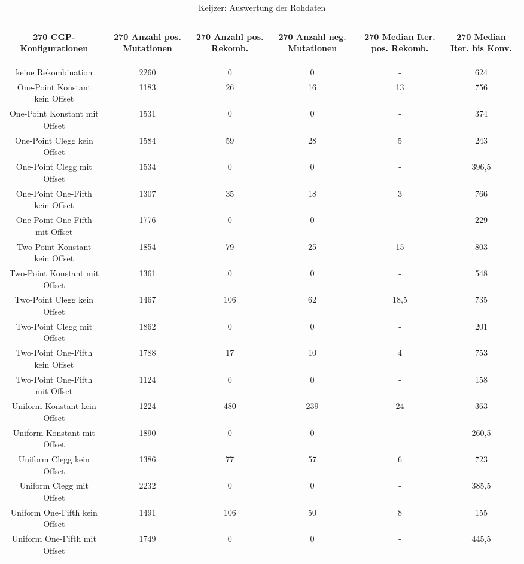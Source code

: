 \begin{table}[H]
	\centering
	\begin{tabular}{c | c | c | c | c | c }
		\begin{turn}{270} \textbf{CGP-Konfigurationen} \end{turn} & \begin{turn}{270} \textbf{Anzahl pos. Mutationen} \end{turn} & \begin{turn}{270} \textbf{Anzahl pos. Rekomb.} \end{turn} & \begin{turn}{270} \textbf{Anzahl neg. Mutationen} \end{turn} & \begin{turn}{270} \textbf{Median Iter. pos. Rekomb.} \end{turn} & \begin{turn}{270} \textbf{Median Iter. bis Konv.} \end{turn}\\
		\hline
		keine Rekombination & 2260 & 0 & 0 & - & 624\\
		\hline
		One-Point Konstant kein Offset & 1183 & 26 & 16 & 13 & 756\\
		\hline
		One-Point Konstant mit Offset & 1531 & 0 & 0 & - & 374\\
		\hline
		One-Point Clegg kein Offset & 1584 & 59 & 28 & 5 & 243\\
		\hline
		One-Point Clegg mit Offset & 1534 & 0 & 0 & - & 396,5\\
		\hline
		One-Point One-Fifth kein Offset & 1307 & 35 & 18 & 3 & 766\\
		\hline
		One-Point One-Fifth mit Offset & 1776 & 0 & 0 & - & 229\\
		\hline
		Two-Point Konstant kein Offset & 1854 & 79 & 25 & 15 & 803\\
		\hline
		Two-Point Konstant mit Offset & 1361 & 0 & 0 & - & 548\\
		\hline
		Two-Point Clegg kein Offset & 1467 & 106 & 62 & 18,5 & 735\\
		\hline
		Two-Point Clegg mit Offset & 1862 & 0 & 0 & - & 201\\
		\hline
		Two-Point One-Fifth kein Offset & 1788 & 17 & 10 & 4 & 753\\
		\hline
		Two-Point One-Fifth mit Offset & 1124 & 0 & 0 & - & 158\\
		\hline
		Uniform Konstant kein Offset & 1224 & 480 & 239 & 24 & 363\\
		\hline
		Uniform Konstant mit Offset & 1890 & 0 & 0 & - & 260,5\\
		\hline
		Uniform Clegg kein Offset & 1386 & 77 & 57 & 6 & 723\\
		\hline
		Uniform Clegg mit Offset & 2232 & 0 & 0 & - & 385,5\\
		\hline
		Uniform One-Fifth kein Offset & 1491 & 106 & 50 & 8 & 155\\
		\hline
		Uniform One-Fifth mit Offset & 1749 & 0 & 0 & - & 445,5\\
	\end{tabular}
	\caption{Keijzer: Auswertung der Rohdaten}
	\label{table:keijzerRohdaten}
\end{table}

